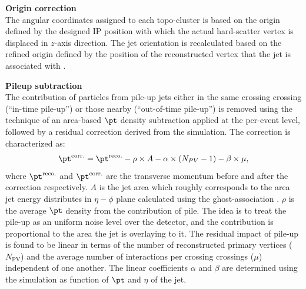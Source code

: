 \begin{description}
\item \textbf{Origin correction} \\
The angular coordinates assigned to each topo-cluster is based on the origin defined by the designed IP position with which the actual hard-scatter vertex is displaced in $z$-axis direction. The jet orientation is recalculated based on the refined origin defined by the position of the reconstructed vertex that the jet is associated with \cite{JESmeas_unct_Run1_inclOC}. 

\item \textbf{Pileup subtraction} \\
The contribution of particles from pile-up jets either in the same crossing crossing (``in-time pile-up'') or those nearby (``out-of-time pile-up'') is removed using the technique of an area-based $\pt$ density subtraction \cite{145_areaBasedPUsub} applied at the per-event level, followed by a residual correction derived from the simulation. The correction is characterized as:
\begin{align}
\pt^{\mathrm{corr.}} = \pt^{\mathrm{reco.}} - \rho \times A - \alpha  \times (N_{PV}-1) - \beta \times \mu,
\label{eq::PUresidual}
\end{align}
where $\pt^{\mathrm{reco.}}$ and $\pt^{\mathrm{corr.}}$ are the transverse momentum before and after the correction respectively. $A$ is the jet area which roughly corresponds to the area jet energy distributes in $\eta-\phi$ plane calculated using the ghost-association \cite{143_JetFindingReview}. $\rho$ is the average $\pt$ density from the contribution of pile. The idea is to treat the pile-up as an uniform noise level over the detector, and the contribution is proportional to the area the jet is overlaying to it. 
The residual impact of pile-up is found to be linear in terms of the number of reconstructed primary vertices ($N_{\mathrm{PV}}$) and the average number of interactions per crossing crossings ($\mu$) independent of one another.
The linear coefficients $\alpha$ and $\beta$ are determined using the simulation as function of $\pt$ and $\eta$ of the jet.





\end{description}
